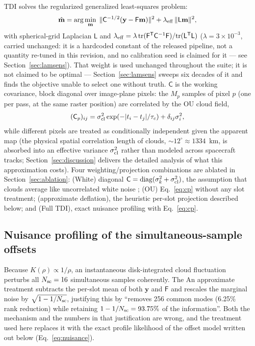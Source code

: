 \documentclass[twocolumn,10pt]{article}
\begin{document}
TDI solves the regularized generalized least-squares problem:
\begin{equation}
\hat{\mathbf{m}}=\arg\min_{\mathbf{m}}\;
\|\mathsf{C}^{-1/2}(\mathbf{y}-\mathsf{F}\mathbf{m})\|^2
+\lambda_{\rm eff}\,\|\mathsf{L}\mathbf{m}\|^2,
\label{eq:tdi}
\end{equation}
with spherical-grid Laplacian $\mathsf{L}$ and
$\lambda_{\rm eff}=\lambda\,{\rm tr}(\mathsf{F}^{\sf T}\mathsf{C}^{-1}\mathsf{F})/{\rm tr}(\mathsf{L}^{\sf T}\mathsf{L})$
($\lambda=3\times10^{-3}$, carried unchanged: it is a hardcoded
constant of the released pipeline, not a quantity re-tuned in this revision, and
no calibration seed is claimed for it --- see Section~\ref{sec:lamsens}).
That weight is used unchanged throughout the suite; it is not
claimed to be optimal --- Section~\ref{sec:lamsens} sweeps six decades of it and
finds the objective unable to select one without truth.
$\mathsf{C}$ is the working covariance, block diagonal over image-plane
pixels: the $M_p$ samples of pixel $p$ (one per pass, at the same raster
position) are correlated by the OU cloud field,
\begin{equation}
(\mathsf{C}_p)_{ij}=\sigma_{\rm cl}^2\exp(-|t_i-t_j|/\tau_c)+\delta_{ij}\sigma_i^2 ,
\label{eq:cp}
\end{equation}
while different pixels are treated as conditionally independent given the
apparent map (the physical spatial correlation length of clouds, $\sim12^\circ\approx1334$~km, is absorbed into an effective variance $\sigma_{\rm cl}^2$ rather than modeled across spacecraft tracks; Section~\ref{sec:discussion} delivers the detailed analysis of what this approximation costs).
Four weighting/projection combinations are ablated in
Section~\ref{sec:ablation}: (White) diagonal
$\mathsf{C}=\mathrm{diag}(\sigma_k^2+\sigma_{\rm cl}^2)$, the assumption that
clouds average like uncorrelated white noise \citep{toth25clouds}; (OU)
Eq.~\ref{eq:cp} without any slot treatment; (approximate deflation), the heuristic
per-slot projection described below; and (Full TDI), exact nuisance profiling
with Eq.~\ref{eq:cp}.

\subsection{Nuisance profiling of the simultaneous-sample offsets}
\label{sec:profiling}
Because $K(\rho)\propto1/\rho$, an instantaneous disk-integrated cloud
fluctuation perturbs all $N_{\rm sc}=16$ simultaneous samples coherently. The
An approximate treatment subtracts the per-slot mean of both $\mathbf{y}$ and
$\mathsf{F}$ and rescales the marginal noise by $\sqrt{1-1/N_{\rm sc}}$,
justifying this by ``removes 256 common modes (6.25\% rank reduction) while
retaining $1-1/N_{\rm sc}=93.75\%$ of the information''. Both the mechanism and
the numbers in that justification are wrong, and the treatment used here replaces it
with the exact profile likelihood of the offset model written out below
(Eq.~\ref{eq:nuisance}).
\end{document}
